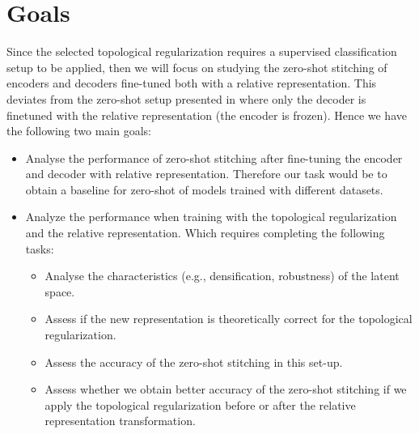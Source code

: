 \documentclass[../main.tex]{subfiles}
\begin{document}
\section{Goals}



Since the selected topological regularization \cite{hofer_densified_2021} requires a supervised classification setup to be applied, then we will focus on studying the zero-shot stitching of encoders and decoders fine-tuned both with a relative representation. This deviates from the zero-shot setup presented in \cite{moschella_relative_2022} where only the decoder is finetuned with the relative representation (the encoder is frozen). Hence we have the following two main goals:

\begin{itemize}
    \item Analyse the performance of zero-shot stitching after fine-tuning the encoder and decoder with relative representation. Therefore our task would be to obtain a baseline for zero-shot of models trained with different datasets.
    
    \item Analyze the performance when training with the topological regularization and the relative representation. Which requires completing the following tasks:

    \begin{itemize}
         \item Analyse the characteristics (e.g., densification, robustness) of the latent space.
         
        \item Assess if the new representation is theoretically correct for the topological regularization.
        
        \item Assess the accuracy of the zero-shot stitching in this set-up.

        \item Assess whether we obtain better accuracy of the zero-shot stitching if we apply the topological regularization before or after the relative representation transformation.
        
    \end{itemize}
\end{itemize}
\end{document}
